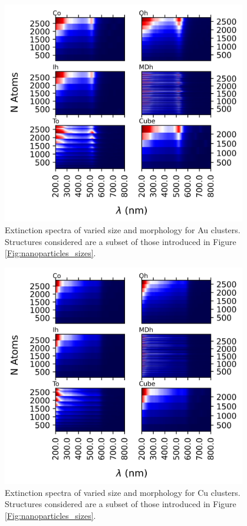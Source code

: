 \begin{figure}[b]
    \includegraphics[width=0.95\textwidth]{figures/LM/GDM/Au_Specs.png}
    \caption{Extinction spectra of varied size and morphology for Au clusters. Structures considered are a subset of those introduced in Figure \ref{Fig:nanoparticles_sizes}.}
    \label{Fig:Size_Au_GDM}
\end{figure}

\begin{figure}[b]
    \includegraphics[width=0.95\textwidth]{figures/LM/GDM/Cu_Specs.png}
    \caption{Extinction spectra of varied size and morphology for Cu clusters. Structures considered are a subset of those introduced in Figure \ref{Fig:nanoparticles_sizes}.} 
    \label{Fig:Size_Cu_GDM}
\end{figure}

